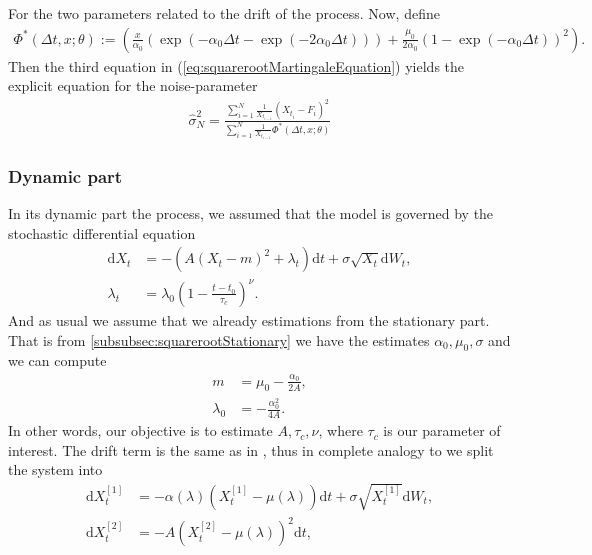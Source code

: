 For the two parameters related to the drift of the process. Now, define
\begin{align}
    \Phi^*(\Delta t, x; \theta) := \left(\frac{x}{\alpha_0}\left(\exp\left(-\alpha_0\Delta t - \exp\left(-2\alpha_0 \Delta t\right)\right)\right) + \frac{\mu_0}{2\alpha_0}\left(1-\exp\left(-\alpha_0\Delta t\right)\right)^2\right).
\end{align}
Then the third equation in (\ref{eq:squarerootMartingaleEquation}) yields the explicit equation for the noise-parameter
\begin{align}
    \hat{\sigma}^2_N = \frac{\sum_{i = 1}^{N}\frac{1}{X_{t_{i - 1}}}\left(X_{t_i} - F_i\right)^2}{\sum_{i = 1}^{N}\frac{1}{X_{t_{i - 1}}}\Phi^*(\Delta t, x; \theta)}
\end{align}
\subsubsection{Dynamic part}\label{subsubsec:squarerootDynamic}
In its dynamic part the process, we assumed that the model is governed by the stochastic differential equation
\begin{align}
    \mathrm{d}X_t &= -\left(A\left(X_t - m\right)^2 + \lambda_t\right)\mathrm{d}t + \sigma \sqrt{X_t} \mathrm{d}W_t, \label{eq:dynamicsquarerootSDE}\\
    \lambda_t &= \lambda_0\left(1 - \frac{t - t_0}{\tau_c}\right)^\nu.
\end{align}
And as usual we assume that we already estimations from the stationary part. That is from \ref{subsubsec:squarerootStationary} we have the estimates $\alpha_0, \mu_0, \sigma$ and we can compute
\begin{align}
    m &= \mu_0 - \frac{\alpha_0}{2A},\\
    \lambda_0 &= - \frac{\alpha_0^2}{4A}.
\end{align}
In other words, our objective is to estimate $A, \tau_c, \nu$, where $\tau_c$ is our parameter of interest. The drift term is the same as in \cite{Ditlevsen2023}, thus in complete analogy to \cite[(S9, S10)]{DitlevsenSupplementary} we split the system into
\begin{align}
    \mathrm{d}X_t^{[1]} &= -\alpha(\lambda)\left(X_t^{[1]} - \mu(\lambda)\right)  \mathrm{d}t + \sigma \sqrt{X_t^{[1]}} \mathrm{d}W_t, \label{eq:squareRootSplit1} \\
    \mathrm{d}X_t^{[2]} &= - A \left(X_t^{[2]} - \mu(\lambda)\right)^2 \mathrm{d}t, \label{eq:squareRootSplit2}
\end{align}
